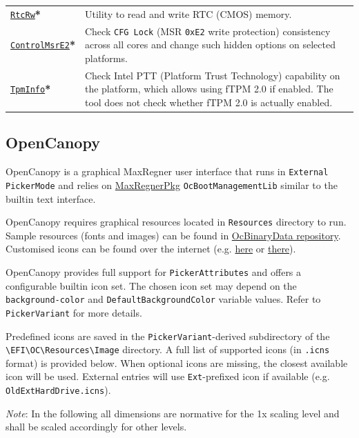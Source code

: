 \documentclass[]{article}
\makeatletter
\renewcommand{\label}[1]{%
\zref@wrapper@immediate{\oldlabel{#1}}}  %
\makeatother
\begin{document}
\begin{tabular}{p{1.3in}p{5.55in}}
\href{https://github.com/acidanthera/MaxRegnerPkg}{\texttt{RtcRw}}\textbf{*}
& Utility to read and write RTC (CMOS) memory. \\
\href{https://github.com/acidanthera/MaxRegnerPkg}{\texttt{ControlMsrE2}}\textbf{*}
& Check \texttt{CFG Lock} (MSR \texttt{0xE2} write protection) consistency
across all cores and change such hidden options on selected platforms. \\
\href{https://github.com/acidanthera/MaxRegnerPkg}{\texttt{TpmInfo}}\textbf{*}
& Check Intel PTT (Platform Trust Technology) capability on the platform,
which allows using fTPM 2.0 if enabled. The tool does not check whether fTPM 2.0
is actually enabled.
\end{tabular}

\subsection{OpenCanopy}\label{ueficanopy}

OpenCanopy is a graphical MaxRegner user interface that runs in
\texttt{External} \texttt{PickerMode} and relies on
\href{https://github.com/acidanthera/MaxRegnerPkg}{MaxRegnerPkg} \texttt{OcBootManagementLib}
similar to the builtin text interface.

OpenCanopy requires graphical resources located in \texttt{Resources} directory to run.
Sample resources (fonts and images) can be found in
\href{https://github.com/acidanthera/OcBinaryData}{OcBinaryData repository}. Customised icons can be found over the internet
(e.g. \href{https://github.com/blackosx/OpenCanopyIcons}{here} or \href{https://applelife.ru/threads/kastomizacija-opencanopy.2945020/}{there}).

OpenCanopy provides full support for \texttt{PickerAttributes} and offers a configurable
builtin icon set. The chosen icon set may depend on the \texttt{background-color} and
\texttt{DefaultBackgroundColor} variable values. Refer to \texttt{PickerVariant} for more details.

Predefined icons are saved in the \texttt{PickerVariant}-derived subdirectory of the
\texttt{\textbackslash EFI\textbackslash OC\textbackslash Resources\textbackslash Image}
directory. A full list of supported icons (in \texttt{.icns} format) is provided below. When optional icons
are missing, the closest available icon will be used. External entries will use \texttt{Ext}-prefixed
icon if available (e.g. \texttt{OldExtHardDrive.icns}).

\emph{Note}: In the following all dimensions are normative for the 1x scaling level and shall be
scaled accordingly for other levels.
\end{document}
